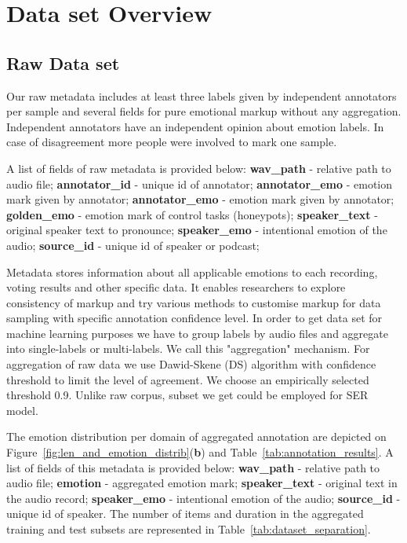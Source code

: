 \documentclass{article}
\begin{document}
\section{Data set Overview}

\subsection{Raw Data set}
Our raw metadata includes at least three labels given by independent annotators per sample and several fields for pure emotional markup without any aggregation. 
Independent annotators have an independent opinion about emotion labels. In case of disagreement more people were involved to mark one sample. 




A list of fields of raw metadata is provided below:
\textbf{wav\_path} - relative path to audio file;
\textbf{annotator\_id} - unique id of annotator;
\textbf{annotator\_emo} - emotion mark given by annotator;
\textbf{annotator\_emo} - emotion mark given by annotator;
\textbf{golden\_emo} - emotion mark of control tasks (honeypots);
\textbf{speaker\_text} - original speaker text to pronounce;
\textbf{speaker\_emo} - intentional emotion of the audio;
\textbf{source\_id} - unique id of speaker or podcast;

Metadata stores information about all applicable emotions to each recording, voting results and other specific data. It enables researchers to explore consistency of markup and try various methods to customise markup for data sampling with specific annotation confidence level.
In order to get data set for machine learning purposes we have to group labels by audio files and aggregate into single-labels or multi-labels. We call this "aggregation" mechanism.
For aggregation of raw data we use Dawid-Skene (DS) algorithm \cite{dawid1979maximum} with confidence threshold to limit the level of agreement. 
We choose an empirically selected threshold 0.9. Unlike raw corpus, subset we get could be employed for SER model.

The emotion distribution per domain of aggregated annotation are depicted on Figure~\ref{fig:len_and_emotion_distrib}(\textbf{b}) and Table~\ref{tab:annotation_results}. A list of fields of this metadata is provided below:
\textbf{wav\_path} - relative path to audio file;
\textbf{emotion} - aggregated emotion mark;
\textbf{speaker\_text} - original text in the audio record;
\textbf{speaker\_emo} - intentional emotion of the audio;
\textbf{source\_id} - unique id of speaker.
The number of items and duration in the aggregated training and test subsets are represented in Table~\ref{tab:dataset_separation}. 
\end{document}
